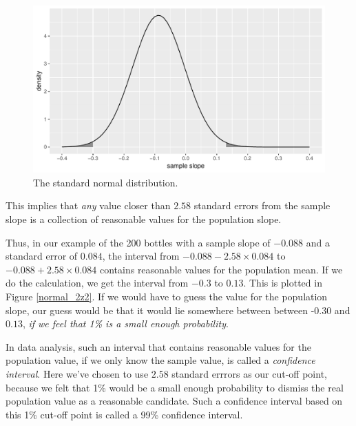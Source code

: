 \documentclass[]{book}\usepackage[]{graphicx}\usepackage[]{color}
\makeatletter
\def\maxwidth{ %
  \ifdim\Gin@nat@width>\linewidth
    \linewidth
  \else
    \Gin@nat@width
  \fi
}
\newenvironment{knitrout}{}{} %
\makeatother
\begin{document}
\begin{knitrout}
\color{fgcolor}\begin{figure}

{\centering \includegraphics[width=\maxwidth]{figure/normal_2z2-1} 

}

\caption[The standard normal distribution]{The standard normal distribution.}\label{fig:normal_2z2}
\end{figure}


\end{knitrout}

This implies that \textit{any} value closer than $2.58$ standard errors from the sample slope is a collection of reasonable values for the population slope.

Thus, in our example of the 200 bottles with a sample slope of $-0.088$ and a standard error of $0.084$, the interval from $-0.088- 2.58 \times 0.084$ to $-0.088+ 2.58 \times 0.084$ contains reasonable values for the population mean. If we do the calculation, we get the interval from $-0.3$ to $0.13$. This is plotted in Figure \ref{normal_2z2}. If we would have to guess the value for the population slope, our guess would be that it would lie somewhere between between -0.30 and $0.13$, \textit{if we feel that 1\% is a small enough probability}.

In data analysis, such an interval that contains reasonable values for the population value, if we only know the sample value, is called a \textit{confidence interval}. Here we've chosen to use $2.58$ standard errrors as our cut-off point, because we felt that 1\% would be a small enough probability to dismiss the real population value as a reasonable candidate. Such a confidence interval based on this 1\% cut-off point is called a 99\% confidence interval.
\end{document}
